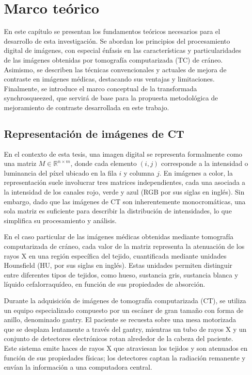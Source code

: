 \chapter{Marco teórico}\label{chapter:state-of-the-art}

En este capítulo se presentan los fundamentos teóricos necesarios para el desarrollo de esta investigación. Se abordan los principios del procesamiento digital de imágenes, con especial énfasis en las características y particularidades de las imágenes obtenidas por tomografía computarizada (TC) de cráneo. Asimismo, se describen las técnicas convencionales y actuales de mejora de contraste en imágenes médicas, destacando sus ventajas y limitaciones. Finalmente, se introduce el marco conceptual de la transformada synchrosqueezed, que servirá de base para la propuesta metodológica de mejoramiento de contraste desarrollada en este trabajo.

\section{Representación de imágenes de CT}

En el contexto de esta tesis, una imagen digital se representa formalmente como una matriz $ M \in \mathbb{R}^{n \times m} $, donde cada elemento $ (i, j) $ corresponde a la intensidad o luminancia del píxel ubicado en la fila $ i $ y columna $ j $. En imágenes a color, la representación suele involucrar tres matrices independientes, cada una asociada a la intensidad de los canales rojo, verde y azul (RGB por sus siglas en inglés). Sin embargo, dado que las imágenes de CT son inherentemente monocromáticas, una sola matriz es suficiente para describir la distribución de intensidades, lo que simplifica su procesamiento y análisis.%

En el caso particular de las imágenes médicas obtenidas mediante tomografía computarizada de cráneo, cada valor de la matriz representa la atenuación de los rayos X en una región específica del tejido, cuantificada mediante unidades Hounsfield (HU, por sus siglas en inglés). Estas unidades permiten distinguir entre diferentes tipos de tejidos, como hueso, sustancia gris, sustancia blanca y líquido cefalorraquídeo, en función de sus propiedades de absorción.%

Durante la adquisición de imágenes de tomografía computarizada (CT), se utiliza un equipo especializado compuesto por un escáner de gran tamaño con forma de anillo, denominado gantry. El paciente se recuesta sobre una mesa motorizada que se desplaza lentamente a través del gantry, mientras un tubo de rayos X y un conjunto de detectores electrónicos rotan alrededor de la cabeza del paciente. Este sistema emite haces de rayos X que atraviesan los tejidos y son atenuados en función de sus propiedades físicas; los detectores captan la radiación remanente y envían la información a una computadora central.%

